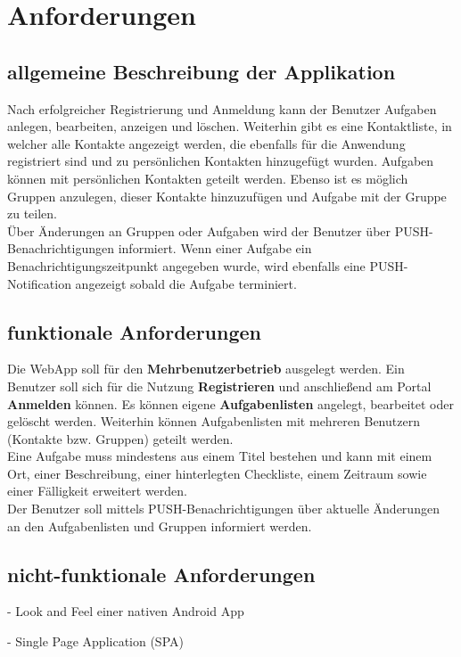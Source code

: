 \section{Anforderungen}

\subsection{allgemeine Beschreibung der Applikation}

Nach erfolgreicher Registrierung und Anmeldung kann der Benutzer Aufgaben anlegen, bearbeiten, anzeigen und löschen. Weiterhin gibt es eine Kontaktliste, in welcher alle Kontakte angezeigt werden, die ebenfalls für die Anwendung registriert sind und zu persönlichen Kontakten hinzugefügt wurden. Aufgaben können mit persönlichen Kontakten geteilt werden. Ebenso ist es möglich Gruppen anzulegen, dieser Kontakte hinzuzufügen und Aufgabe mit der Gruppe zu teilen. \\

Über Änderungen an Gruppen oder Aufgaben wird der Benutzer über PUSH-Benachrichtigungen informiert. Wenn einer Aufgabe ein Benachrichtigungszeitpunkt angegeben wurde, wird ebenfalls eine PUSH-Notification angezeigt sobald die Aufgabe terminiert.


\subsection{funktionale Anforderungen}

Die WebApp soll für den \textbf{Mehrbenutzerbetrieb} ausgelegt werden. Ein Benutzer soll sich für die Nutzung \textbf{Registrieren} und anschließend am Portal \textbf{Anmelden} können. Es können eigene \textbf{Aufgabenlisten} angelegt, bearbeitet oder gelöscht werden. Weiterhin können Aufgabenlisten mit mehreren Benutzern (Kontakte bzw. Gruppen) geteilt werden. \\

Eine Aufgabe muss mindestens aus einem Titel bestehen und kann mit einem Ort, einer Beschreibung, einer hinterlegten Checkliste, einem Zeitraum sowie einer Fälligkeit erweitert werden. \\

Der Benutzer soll mittels PUSH-Benachrichtigungen über aktuelle Änderungen an den Aufgabenlisten und Gruppen informiert werden. 

\subsection{nicht-funktionale Anforderungen}

- Look and Feel einer nativen Android App

- Single Page Application (SPA)
